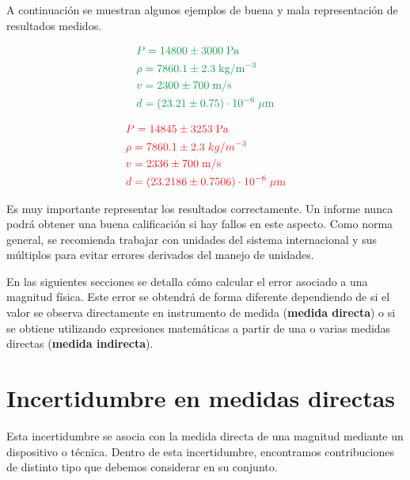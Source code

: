 \documentclass{book}
\begin{document}
A continuación se muestran algunos ejemplos de buena y mala representación de resultados medidos.

\begin{equation}
  \begin{aligned}
    & \color{ForestGreen} P = 14800 \pm 3000 \; \mathrm{Pa} \\
    & \color{ForestGreen} \rho = 7860.1 \pm 2.3 \; \mathrm{kg / m^{-3}} \\
    & \color{ForestGreen} v = 2300 \pm 700 \; \mathrm{m/s} \\
    & \color {ForestGreen} d = ( 23.21 \pm 0.75 ) \cdot 10^{-6} \; \mathrm{\mu m}
  \end{aligned}
\end{equation}

\begin{equation}
  \begin{aligned}
    & \color{Red} P = 14845 \pm 3253 \; \mathrm{Pa} \\
    & \color{Red} \rho = 7860.1 \pm 2.3 \; kg / m^{-3} \\
    & \color{Red} v = 2336 \pm 700 \; \mathrm{m/s} \\
    & \color {Red} d = ( 23.2186 \pm 0.7506 ) \cdot 10^{-6} \; \mathrm{\mu m}
  \end{aligned}
\end{equation}


Es muy importante representar los resultados correctamente. Un informe nunca podrá obtener una
buena calificación si hay fallos en este aspecto. Como norma general, se recomienda trabajar con
unidades del sistema internacional y sus múltiplos para evitar errores derivados del manejo de
unidades.

En las siguientes secciones se detalla cómo calcular el error asociado a una magnitud física. 
Este error se obtendrá de forma diferente dependiendo de si el valor se observa directamente en
instrumento de medida (\textbf{medida directa}) o si se obtiene utilizando expresiones matemáticas a partir
de una o varias medidas directas (\textbf{medida indirecta}).


\section{Incertidumbre en medidas directas}
Esta incertidumbre se asocia con la medida directa de una magnitud mediante un dispositivo o técnica.
Dentro de esta incertidumbre, encontramos contribuciones de distinto tipo que debemos considerar
en su conjunto.
\end{document}

